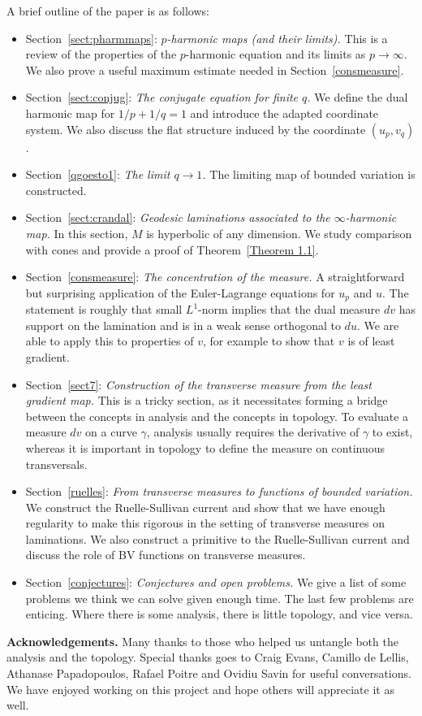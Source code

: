 \documentclass{ip-journal}
\theoremstyle{definition}
\numberwithin{equation}{section}
\begin{document}
A brief outline of the paper is as follows:
\begin{itemize}
\item Section~\ref{sect:pharmmaps}: {\it$p$-harmonic maps (and their limits).}
This is a review of the properties of the $p$-harmonic equation and its limits as $p \rightarrow \infty$. We also prove a useful maximum estimate needed in Section~\ref{consmeasure}.
\item Section~\ref{sect:conjug}: {\it The conjugate equation for finite $q$.} We define the dual harmonic map for $1/p+1/q=1$ and introduce the adapted coordinate system. 
We also discuss the flat structure induced by the coordinate $(u_p,v_q)$.
\item Section~\ref{qgoesto1}: {\it The limit $q \rightarrow 1$.}
The limiting map of bounded variation is constructed.
\item Section~\ref{sect:crandal}: {\it Geodesic laminations associated to the $\infty$-harmonic map.}
In this section, $M$ is hyperbolic of any dimension. We study comparison with cones and provide a proof of Theorem~\ref{Theorem 1.1}.
\item Section~\ref{consmeasure}:  {\it The concentration of the measure.}
A straightforward but surprising application of the Euler-Lagrange equations for $u_p$ and $u$. The statement is roughly that  small $L^1$-norm implies that the dual measure $dv$ has support on the lamination and is in a weak sense  orthogonal to $du$. We are able to apply this to properties of $v$, for example to show that $v$ is of least gradient.
\item Section~\ref{sect7}: {\it Construction of the transverse measure from the least gradient map.}
This is a tricky section, as it necessitates forming a bridge between the concepts in analysis and the concepts in topology. To evaluate a measure $dv$ on a curve $\gamma$, analysis usually requires the derivative of $\gamma$ to exist, whereas it is important in topology to define the measure on continuous transversals.
\item Section~\ref{ruelles}: {\it From transverse measures to functions of bounded variation.}
 We construct the Ruelle-Sullivan current and show that we have enough regularity to make this rigorous in the setting of transverse measures on laminations. We also construct a primitive to the Ruelle-Sullivan current and  discuss the role of BV functions on  transverse measures.
\item Section~\ref{conjectures}: {\it Conjectures and open problems.}
We give a list of some problems we think we can solve given enough time. The last few problems are enticing. Where there is some analysis, there is little topology, and vice versa.
\end{itemize}
{\bf Acknowledgements.}
Many thanks to those who helped us untangle both the analysis and the topology. Special thanks goes to Craig Evans, Camillo de Lellis, Athanase Papadopoulos, Rafael Poitre and Ovidiu Savin for useful conversations. We have enjoyed working on this project and hope others will appreciate it as well.
\end{document}

